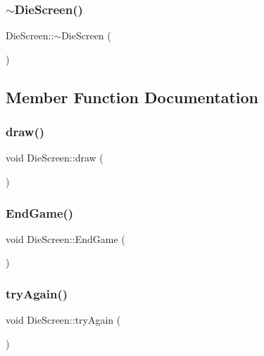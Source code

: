\mbox{\label{class_die_screen_ac5ba7e92fc9155945dca091290661893}} 
\subsubsection{\texorpdfstring{$\sim$DieScreen()}{~DieScreen()}}
{\footnotesize\ttfamily Die\+Screen\+::$\sim$\+Die\+Screen (\begin{DoxyParamCaption}{ }\end{DoxyParamCaption})}



\subsection{Member Function Documentation}
\mbox{\label{class_die_screen_a94785b5d42d608798984c8c368c62296}} 
\subsubsection{\texorpdfstring{draw()}{draw()}}
{\footnotesize\ttfamily void Die\+Screen\+::draw (\begin{DoxyParamCaption}{ }\end{DoxyParamCaption})}

\mbox{\label{class_die_screen_a2d739b1993285caa83f7dc330380deb6}} 
\subsubsection{\texorpdfstring{EndGame()}{EndGame()}}
{\footnotesize\ttfamily void Die\+Screen\+::\+End\+Game (\begin{DoxyParamCaption}{ }\end{DoxyParamCaption})}

\mbox{\label{class_die_screen_a5693b4cc396d654b84722ea6de2f9d8f}} 
\subsubsection{\texorpdfstring{tryAgain()}{tryAgain()}}
{\footnotesize\ttfamily void Die\+Screen\+::try\+Again (\begin{DoxyParamCaption}{ }\end{DoxyParamCaption})}

